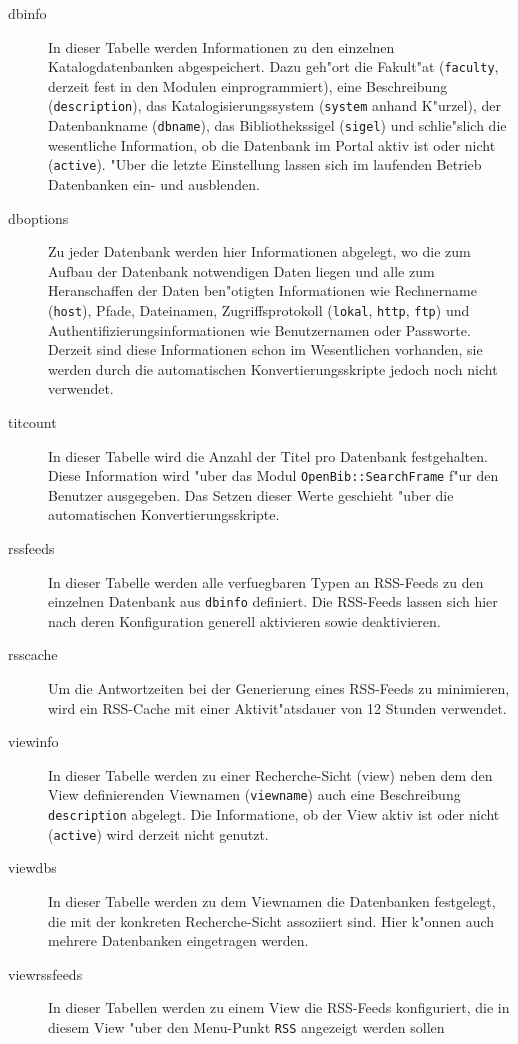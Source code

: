 \documentclass[11pt, twoside, a4paper, BCOR8mm, DIV12, bibtotoc,idxtotoc]{scrbook}
\begin{document}
\begin{itemize}
\begin{description}
\item[dbinfo] In dieser Tabelle werden Informationen zu den einzelnen
  Katalogdatenbanken ab\-ge\-spei\-chert. Dazu geh"ort die Fakult"at
  (\texttt{faculty}, derzeit fest in den Modulen einprogrammiert),
  eine Beschreibung (\texttt{description}), das Katalogisierungssystem
  (\texttt{system} anhand K"urzel), der Datenbankname
  (\texttt{dbname}), das Bibliothekssigel (\texttt{sigel}) und
  schlie"slich die wesentliche Information, ob die Datenbank im Portal
  aktiv ist oder nicht (\texttt{active}). "Uber die letzte Einstellung
  lassen sich im laufenden Betrieb Datenbanken ein- und ausblenden.
\item[dboptions] Zu jeder Datenbank werden hier Informationen
  abgelegt, wo die zum Aufbau der Datenbank notwendigen Daten liegen
  und alle zum Heranschaffen der Daten ben"otigten Informationen wie
  Rechnername (\texttt{host}), Pfade, Dateinamen, Zugriffsprotokoll
  (\texttt{lokal}, \texttt{http}, \texttt{ftp}) und
  Authentifizierungsinformationen wie Benutzernamen oder Passworte.
  Derzeit sind diese Informationen schon im Wesentlichen vorhanden,
  sie werden durch die automatischen Konvertierungsskripte jedoch noch
  nicht verwendet.
\item[titcount] In dieser Tabelle wird die Anzahl der Titel pro
  Datenbank festgehalten. Diese Information wird "uber das Modul
  \texttt{OpenBib::SearchFrame} f"ur den Benutzer ausgegeben. Das Setzen
  dieser Werte geschieht "uber die automatischen
  Konvertierungsskripte.
\item[rssfeeds] In dieser Tabelle werden alle verfuegbaren Typen an RSS-Feeds
  zu den einzelnen Datenbank aus \texttt{dbinfo} definiert. Die
  RSS-Feeds lassen sich hier nach deren Konfiguration generell
  aktivieren sowie deaktivieren.
\item[rsscache] Um die Antwortzeiten bei der Generierung eines
  RSS-Feeds zu minimieren, wird ein RSS-Cache mit einer
  Aktivit"atsdauer von 12 Stunden verwendet.
\item[viewinfo] In dieser Tabelle werden zu einer Recherche-Sicht
  (view) neben dem den View de\-fi\-nier\-enden Viewnamen
  (\texttt{viewname}) auch eine Beschreibung \texttt{description}
  abgelegt. Die Informatione, ob der View aktiv ist oder nicht
  (\texttt{active}) wird derzeit nicht genutzt.
\item[viewdbs] In dieser Tabelle werden zu dem Viewnamen die Datenbanken
  festgelegt, die mit der konkreten Recherche-Sicht assoziiert
  sind. Hier k"onnen auch mehrere Datenbanken ein\-ge\-tra\-gen werden.
\item[viewrssfeeds] In dieser Tabellen werden zu einem View die
  RSS-Feeds konfiguriert, die in diesem View "uber den Menu-Punkt
  \texttt{RSS} angezeigt werden sollen


\end{description}
\end{itemize}
\end{document}

